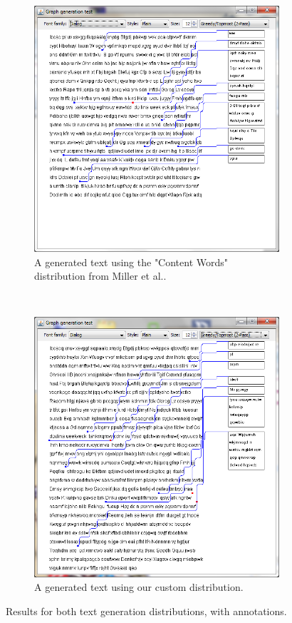 \documentclass[11pt,a4paper]{vutinfth}
\begin{document}
\begin{figure}
	\centering
	\begin{subfigure}[b]{\textwidth}
		\centering
		\includegraphics[scale=0.65]{ContentWords.png}
		\caption{A generated text using the "Content Words" distribution from Miller et al.\cite{Miller1958}.}
	\end{subfigure}
	~\\
	\begin{subfigure}[b]{\textwidth}
		\centering
		\includegraphics[scale=0.65]{LongerWords.png}
		\caption{A generated text using our custom distribution.}
	\end{subfigure}
	\label{fig:wordlength}
	\caption{Results for both text generation distributions, with annotations.}
\end{figure}	
\end{document}
